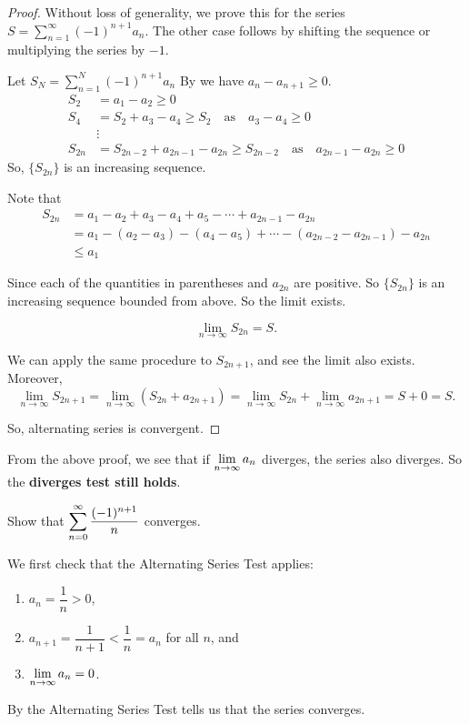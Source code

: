 \begin{proof}
    Without loss of generality, we prove this for the series $S = \sum_{n=1}^\infty (-1)^{n+1} a_n$. The other case follows by shifting the sequence or multiplying the series by $-1$.

    Let $S_N = \sum_{n=1}^N (-1)^{n+1} a_n$
    By  we have $a_n - a_{n+1} \geq 0$.
    \begin{align*}
        S_2 &= a_1 - a_2 \geq 0\\
        S_4 &= S_2 + a_3 - a_4 \geq S_2 \quad \text{as} \quad a_3 - a_4 \geq 0\\
        &\vdots\\
        S_{2n} &= S_{2n-2} + a_{2n-1} - a_{2n} \geq S_{2n-2} \quad \text{as} \quad a_{2n-1} - a_{2n} \geq 0
    \end{align*}
    So, $\{S_{2n}\}$ is an increasing sequence.
    
    Note that 
    \begin{align*}
        S_{2n} &= a_1 - a_2 + a_3 - a_4 + a_5 - \cdots + a_{2n-1} - a_{2n}\\
        &= a_1 - (a_2 - a_3) - (a_4 - a_5) + \cdots - (a_{2n-2} - a_{2n-1}) - a_{2n} \\
        &\leq a_1 
    \end{align*}

Since each of the quantities in parentheses and $a_{2n}$ are positive. So $\{S_{2n}\}$ is an increasing sequence bounded from above. So the limit exists.

\[\lim_{n \to \infty} S_{2n} = S.\]

We can apply the same procedure to $S_{2n+1}$, and see the limit also exists. Moreover,
\[\lim_{n \to \infty} S_{2n+1} = \lim_{n \to \infty} (S_{2n} + a_{2n+1}) = \lim_{n \to \infty} S_{2n} + \lim_{n \to \infty} a_{2n+1} = S + 0 = S.\]

So, alternating series is convergent. 

\end{proof}
\begin{rmk}
    From the above proof, we see that if $\displaystyle\lim_{n \to \infty} a_n$ diverges, the series also diverges. So the \textbf{diverges test still holds}.   
\end{rmk}

\begin{ex}
    Show that $\displaystyle\sum_{n=0}^\infty \dfrac{(-1)^{n+1}}{n}$ converges.
    
    We first check that the Alternating Series Test applies: 
    \begin{enumerate}[label = \circled{\arabic*}]
        \item $a_n = \dfrac{1}{n} > 0$,
        \item $a_{n+1} = \dfrac{1}{n+1} < \dfrac{1}{n} = a_n$ for all $n$, and
        \item $\displaystyle\lim_{n \to \infty} a_n = 0$.
    \end{enumerate}
    By the Alternating Series Test tells us that the series converges. 
\end{ex}


